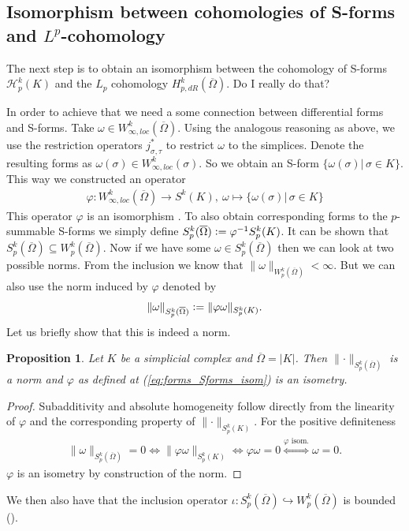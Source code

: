 \documentclass[12pt,a4paper]{article}
\numberwithin{equation}{subsection}
\numberwithin{lemma}{subsection}
\newtheorem{proposition}[lemma]{Proposition}
\theoremstyle{definition}
\newcommand{\lpcoho}{H^k_{p,dR}}
\newcommand{\norm}[2]{\lVert #1 \rVert_{#2}}
\newcommand{\omegabar}{\overline{\Omega}}
\begin{document}
\subsection{Isomorphism between cohomologies of S-forms and $L^p$-cohomology}


The next step is to obtain an isomorphism between the cohomology 
of S-forms $\mathscr{H}_p^k(K)$ and the $L_p$ cohomology 
$\lpcoho(\omegabar)$. {\color{red} Do I really do that?}

In order to achieve that we need a some connection between differential forms
and S-forms. Take $\omega \in W_{\infty,loc}^k(\omegabar)$. Using the analogous
reasoning as above, we use the restriction operators $j^*_{\sigma,\tau}$ to 
restrict $\omega$ to the simplices. Denote the resulting 
forms as $\omega(\sigma) \in W^k_{\infty,loc}(\sigma)$. So we obtain an 
S-form $\{ \omega(\sigma) | \, \sigma \in K \}$. This way we constructed 
an operator 
\begin{align}
    \varphi: W_{\infty,loc}^k(\omegabar) \rightarrow S^k(K),\ \omega \mapsto 
    \{ \omega(\sigma) | \, \sigma \in K \} \label{eq:forms_Sforms_isom}
\end{align}
This 
operator $\varphi$ is an isomorphism \cite[Lemma~1]{goldshtein}. 
To also obtain corresponding forms to the $p$-summable S-forms we simply 
define $S^k_p(\omegabar) \vcentcolon= \varphi^{-1}S^k_p(K)$.
It can be shown that $S^k_p(\omegabar) \subseteq W^k_p(\omegabar)$.
Now if we have some $\omega \in S^k_p(\omegabar)$ then we can look at 
two possible norms. From the inclusion we know that 
$\norm{\omega}{W^k_p(\omegabar)} < \infty$. But we can also use the norm 
induced by $\varphi$ denoted by 
\begin{align}
    \norm{\omega}{S^k_p(\omegabar)} 
    \vcentcolon= \norm{\varphi \omega}{S^k_p(K)}. \label{eq:induced_norm}
\end{align}
Let us briefly show that this is indeed a norm.
\begin{proposition}
    Let $K$ be a simplicial complex and $\omegabar = |K|$. 
    Then $\norm{\cdot}{S^k_p(\omegabar)}$ 
    is a norm and $\varphi$ as defined at (\ref{eq:forms_Sforms_isom})  
    is an isometry.
\end{proposition}
\begin{proof}
    Subadditivity and absolute homogeneity follow directly from the linearity 
    of $\varphi$ and the corresponding property of $\norm{\cdot}{S^k_p(K)}$.
    For the positive definiteness 
    \begin{align*}
        \norm{\omega}{S^k_p(\omegabar)} = 0 
        \Leftrightarrow \norm{\varphi \omega}{S^k_p(K)}
        \Leftrightarrow \varphi \omega = 0
        \stackrel{\varphi \text{ isom.}}{\Leftrightarrow} \omega = 0.
    \end{align*}
    $\varphi$ is an isometry by construction of the norm.
\end{proof}
We then also have that the inclusion operator $\iota: S^k_p(\omegabar) 
\hookrightarrow W^k_p(\omegabar)$
is bounded (\cite[Lemma\,4]{goldshtein}). 
\end{document}

